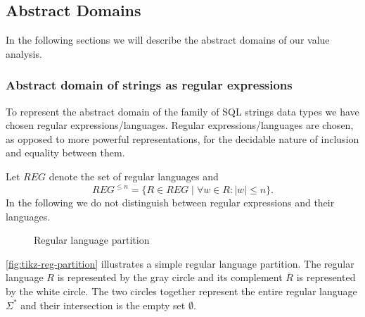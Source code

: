 \subsection{Abstract Domains}\label{subsec:abstract-domains}

In the following sections we will describe the abstract domains of our value analysis.

\subsubsection{Abstract domain of strings as regular expressions}\label{subsubsec:abstract_domains_strings}

To represent the abstract domain of the family of SQL strings data types we have chosen regular expressions/languages.
Regular expressions/languages are chosen, as opposed to more powerful representations, for the decidable nature of inclusion and equality between them.

Let $REG$ denote the set of regular languages and
\begin{equation*}
    REG^{\leq n} = \{R \in REG \mid \forall w \in R : |w| \leq n\}.
\end{equation*}
In the following we do not distinguish between regular expressions and their languages.

\begin{figure}
    \caption{Regular language partition}
    \label{fig:tikz-reg-partition}
\end{figure}

\autoref{fig:tikz-reg-partition} illustrates a simple regular language partition. The regular language $R$ is represented by the gray circle and its complement $\overline{R}$ is represented by the white circle. The two circles together represent the entire regular language $\Sigma^*$ and their intersection is the empty set $\emptyset$.

